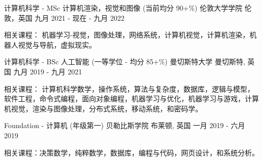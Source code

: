 

\begin{cventries}

  \cventry
    {计算机科学 - MSc 计算机渲染，视觉和图像 (当前均分 90+\%)} %
    {伦敦大学学院} %
    {伦敦，英国} %
    {九月 2021 - 现在 - 九月 2022} %
    {
      \begin{cvitems} %
        \item {相关课程： 机器学习-视觉，图像处理，网络系统，计算机视觉，计算机渲染，机器人视觉与导航，虚拟现实。}
      \end{cvitems}
    }
    
  \cventry
    {计算机科学 - BSc 人工智能 (一等学位 - 均分 85+\%)} %
    {曼切斯特大学} %
    {曼切斯特, 英国} %
    {九月 2019 - 九月 2021} %
    {
      \begin{cvitems} %
        \item {相关课程： 计算机科学数学，操作系统，算法与复杂度，数据库，逻辑与模型，软件工程，命令式编程，面向对象编程，机器学习与优化，机器学习与游戏，计算机视觉，渲染与图像处理，分布式系统，移动系统，和密码学。}
      \end{cvitems}
    }
    
    \cventry
    {Foundation - 计算机 (年级第一)} %
    {贝勒比斯学院} %
    {布莱顿, 英国} %
    {一月 2019 - 六月 2019} %
    {
     \begin{cvitems} %
        \item {相关课程：决策数学，纯粹数学，数据库，编程与代码，网页设计，和系统分析。}
      \end{cvitems}
    }
    

\end{cventries}
